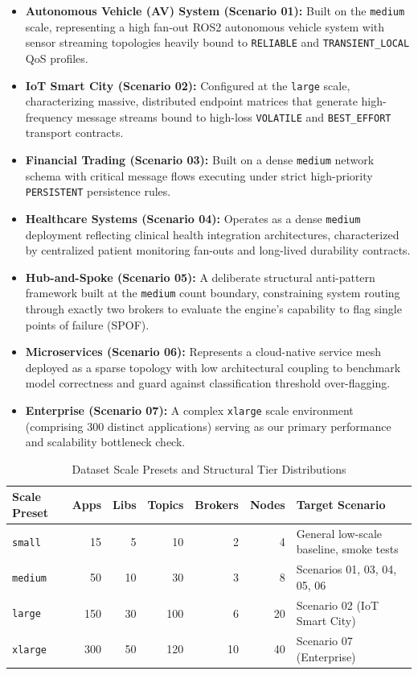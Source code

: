 \documentclass[review]{elsarticle}
\begin{document}
\begin{itemize}
\item \textbf{Autonomous Vehicle (AV) System (Scenario 01):} Built on the \texttt{medium} scale,
  representing a high fan-out ROS2 autonomous vehicle system with sensor streaming topologies
  heavily bound to \texttt{RELIABLE} and \texttt{TRANSIENT\_LOCAL} QoS profiles.
\item \textbf{IoT Smart City (Scenario 02):} Configured at the \texttt{large} scale, characterizing
  massive, distributed endpoint matrices that generate high-frequency message streams bound to
  high-loss \texttt{VOLATILE} and \texttt{BEST\_EFFORT} transport contracts.
\item \textbf{Financial Trading (Scenario 03):} Built on a dense \texttt{medium} network schema
  with critical message flows executing under strict high-priority \texttt{PERSISTENT} persistence
  rules.
\item \textbf{Healthcare Systems (Scenario 04):} Operates as a dense \texttt{medium} deployment
  reflecting clinical health integration architectures, characterized by centralized patient
  monitoring fan-outs and long-lived durability contracts.
\item \textbf{Hub-and-Spoke (Scenario 05):} A deliberate structural anti-pattern framework built at
  the \texttt{medium} count boundary, constraining system routing through exactly two brokers to
  evaluate the engine's capability to flag single points of failure (SPOF).
\item \textbf{Microservices (Scenario 06):} Represents a cloud-native service mesh deployed as a
  sparse topology with low architectural coupling to benchmark model correctness and guard against
  classification threshold over-flagging.
\item \textbf{Enterprise (Scenario 07):} A complex \texttt{xlarge} scale environment (comprising
  300 distinct applications) serving as our primary performance and scalability bottleneck check.
\end{itemize}

\begin{table}[htbp]
\centering
\caption{Dataset Scale Presets and Structural Tier Distributions}
\label{tab:scale}
\begin{tabular}{@{}lrrrrrl@{}}
\toprule
Scale Preset & Apps & Libs & Topics & Brokers & Nodes & Target Scenario \\
\midrule
\texttt{small} & 15 & 5 & 10 & 2 & 4 & General low-scale baseline, smoke tests \\
\texttt{medium} & 50 & 10 & 30 & 3 & 8 & Scenarios 01, 03, 04, 05, 06 \\
\texttt{large} & 150 & 30 & 100 & 6 & 20 & Scenario 02 (IoT Smart City) \\
\texttt{xlarge} & 300 & 50 & 120 & 10 & 40 & Scenario 07 (Enterprise) \\
\bottomrule
\end{tabular}
\end{table}
\end{document}
